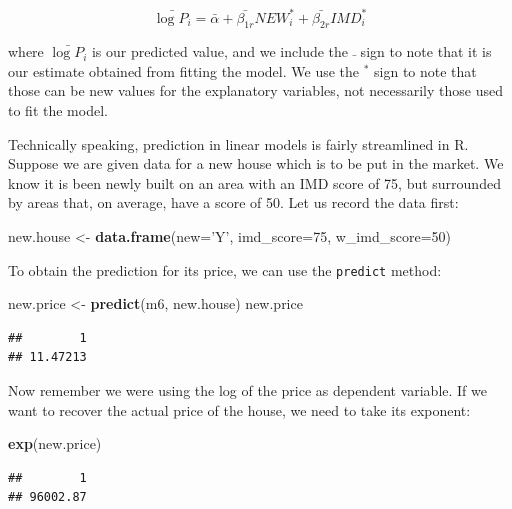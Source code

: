 \documentclass[]{book}
\newenvironment{Shaded}{\begin{snugshade}}{\end{snugshade}}
\newcommand{\KeywordTok}[1]{\textcolor[rgb]{0.13,0.29,0.53}{\textbf{#1}}}
\newcommand{\DataTypeTok}[1]{\textcolor[rgb]{0.13,0.29,0.53}{#1}}
\newcommand{\DecValTok}[1]{\textcolor[rgb]{0.00,0.00,0.81}{#1}}
\newcommand{\StringTok}[1]{\textcolor[rgb]{0.31,0.60,0.02}{#1}}
\newcommand{\NormalTok}[1]{#1}
\begin{document}
\[
\bar{\log{P_i}} = \bar{\alpha} + \bar{\beta_{1r}} NEW_i^* + \bar{\beta_{2r}} IMD_i^*
\]

where \(\bar{\log{P_i}}\) is our predicted value, and we include the
\(\bar{}\) sign to note that it is our estimate obtained from fitting
the model. We use the \(^*\) sign to note that those can be new values
for the explanatory variables, not necessarily those used to fit the
model.

Technically speaking, prediction in linear models is fairly streamlined
in R. Suppose we are given data for a new house which is to be put in
the market. We know it is been newly built on an area with an IMD score
of 75, but surrounded by areas that, on average, have a score of 50. Let
us record the data first:

\begin{Shaded}
\begin{Highlighting}[]
\NormalTok{new.house <-}\StringTok{ }\KeywordTok{data.frame}\NormalTok{(}\DataTypeTok{new=}\StringTok{'Y'}\NormalTok{, }\DataTypeTok{imd_score=}\DecValTok{75}\NormalTok{, }\DataTypeTok{w_imd_score=}\DecValTok{50}\NormalTok{)}
\end{Highlighting}
\end{Shaded}

To obtain the prediction for its price, we can use the \texttt{predict}
method:

\begin{Shaded}
\begin{Highlighting}[]
\NormalTok{new.price <-}\StringTok{ }\KeywordTok{predict}\NormalTok{(m6, new.house)}
\NormalTok{new.price}
\end{Highlighting}
\end{Shaded}

\begin{verbatim}
##        1 
## 11.47213
\end{verbatim}

Now remember we were using the log of the price as dependent variable.
If we want to recover the actual price of the house, we need to take its
exponent:

\begin{Shaded}
\begin{Highlighting}[]
\KeywordTok{exp}\NormalTok{(new.price)}
\end{Highlighting}
\end{Shaded}

\begin{verbatim}
##        1 
## 96002.87
\end{verbatim}
\end{document}
